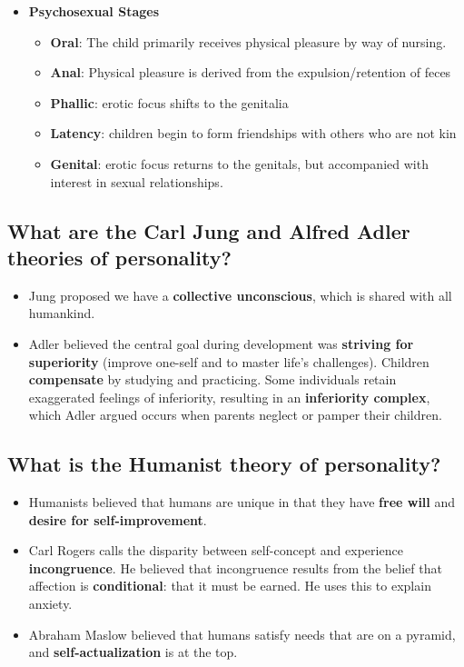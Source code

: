 \documentclass[10pt,letter]{article}
\theoremstyle{plain}
\theoremstyle{definition}
\begin{document}
\begin{itemize}
    \item \textbf{Psychosexual Stages}\begin{itemize}
        \item \textbf{Oral}: The child primarily receives physical pleasure by way of nursing. 
        \item \textbf{Anal}: Physical pleasure is derived from the expulsion/retention of feces 
        \item \textbf{Phallic}: erotic focus shifts to the genitalia
        \item \textbf{Latency}: children begin to form friendships with others who are not kin
        \item \textbf{Genital}: erotic focus returns to the genitals, but accompanied with interest in sexual relationships. 
    \end{itemize}
\end{itemize}

\subsection*{What are the Carl Jung and Alfred Adler theories of personality?}
\begin{itemize}
    \item Jung proposed we have a \textbf{collective unconscious}, which is shared with all humankind. 
    \item Adler believed the central goal during development was \textbf{striving for superiority} (improve one-self and to master life's challenges). Children \textbf{compensate} by studying and practicing. Some individuals retain exaggerated feelings of inferiority, resulting in an \textbf{inferiority complex}, which Adler argued occurs when parents neglect or pamper their children. 
\end{itemize}

\subsection*{What is the Humanist theory of personality?}
\begin{itemize}
    \item Humanists believed that humans are unique in that they have \textbf{free will} and \textbf{desire for self-improvement}. 
    \item Carl Rogers calls the disparity between self-concept and experience \textbf{incongruence}. He believed that incongruence results from the belief that affection is \textbf{conditional}: that it must be earned. He uses this to explain anxiety. 
    \item Abraham Maslow believed that humans satisfy needs that are on a pyramid, and \textbf{self-actualization} is at the top.
\end{itemize}
\end{document}
